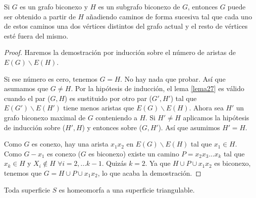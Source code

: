 \documentclass[12pt,a4paper,oldfontcommands]{memoir}
\begin{document}
\begin{lemma}\label{lema27}
	Si $G$ es un grafo biconexo y $H$ es un subgrafo biconexo de $G$, entonces $G$ puede ser obtenido a partir de $H$ añadiendo caminos de forma sucesiva tal que cada uno de estos caminos una dos vértices distintos del grafo actual y el resto de vértices esté fuera del mismo.
\end{lemma}

\begin{proof}
	Haremos la demostración por inducción sobre el número de aristas de $E(G) \backslash E(H)$.

	Si ese número es cero, tenemos $G = H$. No hay nada que probar. Así que  asumamos que $G \neq H$. Por la hipótesis de inducción, el lema \ref{lema27} es válido cuando el par ($G,H$) es sustituido por otro par ($G',H'$) tal que $E(G') \backslash E(H')$ tiene menos aristas que $E(G) \backslash E(H)$. Ahora sea $H'$ un grafo biconexo maximal  de $G$ conteniendo a $H$. Si $H' \neq H$ aplicamos la hipótesis de inducción sobre ($H',H$) y entonces sobre ($G,H'$). Así que asumimos $H' = H$.

	Como $G$ es conexo, hay una arista $x_{1}x_{2}$ en $E(G) \backslash E(H)$ tal que $x_{1} \in H$. Como $G - x_{1}$ es conexo ($G$ es biconexo) existe un camino $P = x_{2}x_{3}...x_{k}$ tal que $x_{k} \in H$ y $X_i \notin H$ $\forall i = 2,... k-1$. Quizás $k = 2$. Ya que $H \cup P \cup {x_{1}x_{2}}$ es biconexo, tenemos que $G = H \cup P \cup {x_{1}x_{2}}$, lo que acaba la demostración.
\end{proof}

\begin{theorem}
	Toda superficie $S$ es homeomorfa a una superficie triangulable.
\end{theorem}
\end{document}
